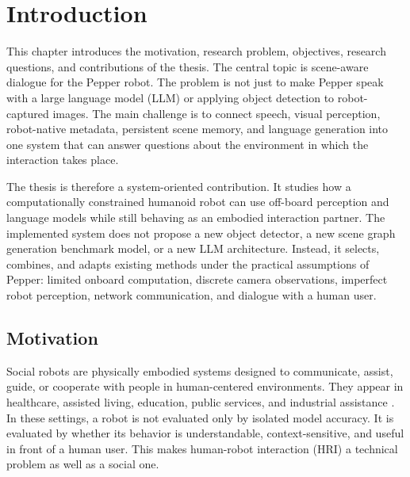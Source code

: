 \chapter{Introduction}\label{chap:intro}

This chapter introduces the motivation, research problem, objectives, research questions, and contributions of the thesis. The central topic is scene-aware dialogue for the Pepper robot. The problem is not just to make Pepper speak with a large language model (LLM) or applying object detection to robot-captured images. The main challenge is to connect speech, visual perception, robot-native metadata, persistent scene memory, and language generation into one system that can answer questions about the environment in which the interaction takes place.

The thesis is therefore a system-oriented contribution. It studies how a computationally constrained humanoid robot can use off-board perception and language models while still behaving as an embodied interaction partner. The implemented system does not propose a new object detector, a new scene graph generation benchmark model, or a new LLM architecture. Instead, it selects, combines, and adapts existing methods under the practical assumptions of Pepper: limited onboard computation, discrete camera observations, imperfect robot perception, network communication, and dialogue with a human user.



\section{Motivation}\label{sec:intro-motivation}

Social robots are physically embodied systems designed to communicate, assist, guide, or cooperate with people in human-centered environments. They appear in healthcare, assisted living, education, public services, and industrial assistance \cite{Han2024HRIHealthcare,liao_use_2023,latif_physicsassistant_2024,sievers_humanoid_2025,horak_v_2018,brad_retrieval-augmented_2025}. In these settings, a robot is not evaluated only by isolated model accuracy. It is evaluated by whether its behavior is understandable, context-sensitive, and useful in front of a human user. This makes human-robot interaction (HRI) a technical problem as well as a social one.

